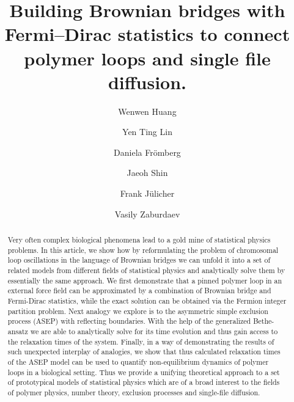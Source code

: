 \documentclass[aps,showpacs,twocolumn,floatfix,prx,superscriptaddress]{revtex4-1}
\begin{document}
\title{Building Brownian bridges with Fermi--Dirac statistics to connect polymer loops and single file diffusion.}

\author{Wenwen Huang}
\author{Yen Ting Lin}
\author{Daniela Fr\"{o}mberg}
\author{Jaeoh Shin}
\author{Frank J\"{u}licher}
\author{Vasily Zaburdaev}


\begin{abstract}
{Very often complex biological phenomena lead to a gold mine of statistical physics problems. In this article, we show how by reformulating the problem of chromosomal loop oscillations in the language of Brownian bridges we can unfold it into a set of related models from different fields of statistical physics and analytically solve them by essentially the same approach. We first demonstrate that a pinned polymer loop in an external force field can be approximated by a combination of Brownian bridge and Fermi-Dirac statistics, while the exact solution can be obtained via the Fermion integer partition problem. Next analogy we explore is to the asymmetric simple exclusion process (ASEP) with reflecting boundaries. With the help of the generalized Bethe-ansatz we are able to analytically solve for its time evolution and thus gain access to the relaxation times of the system. Finally, in a way of demonstrating the results of such unexpected interplay of analogies, we show that thus calculated relaxation times of the ASEP model can be used to quantify non-equilibrium dynamics of polymer loops in a biological setting. Thus we provide a unifying theoretical approach to a set of prototypical models of statistical physics which are of a broad interest to the fields of polymer physics, number theory, exclusion processes and single-file diffusion.}
\end{abstract}
\maketitle
\end{document}
